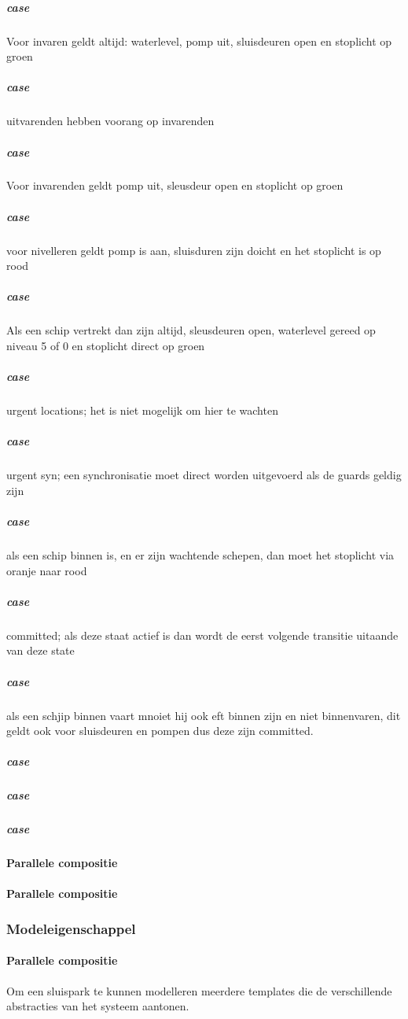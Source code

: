 \documentclass[11pt]{report} %
\begin{document}
 \subparagraph{case}
 Voor invaren geldt altijd: waterlevel, pomp uit, sluisdeuren open en stoplicht op groen
 
  \subparagraph{case}
  uitvarenden hebben voorang op invarenden
  
   \subparagraph{case}
   Voor invarenden geldt pomp uit, sleusdeur open en stoplicht op groen
    \subparagraph{case}
    voor nivelleren geldt pomp is aan, sluisduren zijn doicht en het stoplicht is op rood
     \subparagraph{case}
     Als een schip vertrekt dan zijn altijd, sleusdeuren open, waterlevel gereed op niveau 5 of 0 en stoplicht direct op groen
      \subparagraph{case}
      urgent locations; het is niet mogelijk om hier te wachten
       \subparagraph{case}
       urgent syn; een synchronisatie moet direct worden uitgevoerd als de guards geldig zijn
       
        \subparagraph{case}
        als een schip binnen is, en er zijn wachtende schepen, dan moet het stoplicht via oranje naar rood
         \subparagraph{case}
         committed; als deze staat actief is dan wordt de eerst volgende transitie uitaande van deze state
          \subparagraph{case}
          als een schjip binnen vaart mnoiet hij ook eft binnen zijn en niet binnenvaren, dit geldt ook voor sluisdeuren en pompen dus deze zijn committed.
           \subparagraph{case}
           
            \subparagraph{case}
            
             \subparagraph{case}
             
\paragraph{Parallele compositie}


\paragraph{Parallele compositie}

\subsubsection{Modeleigenschappel}
\paragraph{Parallele compositie}
Om een sluispark te kunnen modelleren meerdere templates die de verschillende abstracties van het systeem aantonen.
\end{document}
